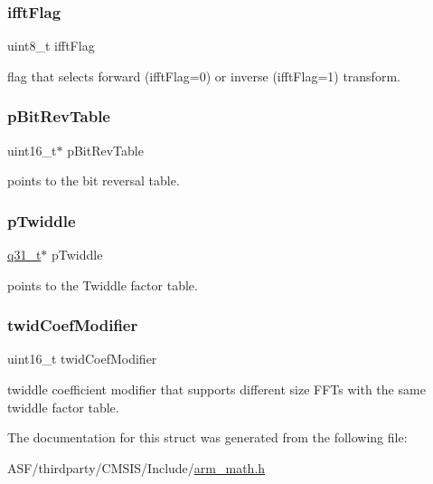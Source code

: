 \subsubsection{\texorpdfstring{ifftFlag}{ifftFlag}}
{\footnotesize\ttfamily uint8\+\_\+t ifft\+Flag}

flag that selects forward (ifft\+Flag=0) or inverse (ifft\+Flag=1) transform. \mbox{\label{structarm__cfft__radix2__instance__q31_a46a2fb328199897af100fea0bfdf59aa}} 
\subsubsection{\texorpdfstring{pBitRevTable}{pBitRevTable}}
{\footnotesize\ttfamily uint16\+\_\+t$\ast$ p\+Bit\+Rev\+Table}

points to the bit reversal table. \mbox{\label{structarm__cfft__radix2__instance__q31_a2505b7d5ec077b244c712797a5253b6d}} 
\subsubsection{\texorpdfstring{pTwiddle}{pTwiddle}}
{\footnotesize\ttfamily \mbox{\hyperlink{arm__math_8h_adc89a3547f5324b7b3b95adec3806bc0}{q31\+\_\+t}}$\ast$ p\+Twiddle}

points to the Twiddle factor table. \mbox{\label{structarm__cfft__radix2__instance__q31_afe772e5b5001c9d8e85032115a8df5bf}} 
\subsubsection{\texorpdfstring{twidCoefModifier}{twidCoefModifier}}
{\footnotesize\ttfamily uint16\+\_\+t twid\+Coef\+Modifier}

twiddle coefficient modifier that supports different size F\+F\+Ts with the same twiddle factor table. 

The documentation for this struct was generated from the following file\+:\begin{DoxyCompactItemize}
\item 
A\+S\+F/thirdparty/\+C\+M\+S\+I\+S/\+Include/\mbox{\hyperlink{arm__math_8h}{arm\+\_\+math.\+h}}\end{DoxyCompactItemize}
